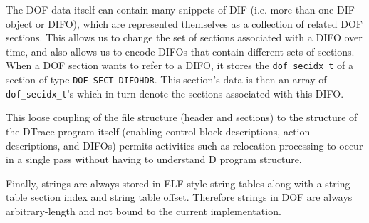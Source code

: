 The DOF data itself can contain many snippets of DIF (i.e. more than
one DIF object or DIFO), which are represented themselves as a
collection of related DOF sections.  This allows us to change the set
of sections associated with a DIFO over time, and also allows us to
encode DIFOs that contain different sets of sections.  When a DOF
section wants to refer to a DIFO, it stores the \verb|dof_secidx_t| of
a section of type \verb|DOF_SECT_DIFOHDR|.  This section's data is
then an array of \verb|dof_secidx_t|'s which in turn denote the
sections associated with this DIFO.

This loose coupling of the file structure (header and sections) to the
structure of the DTrace program itself (enabling control block
descriptions, action descriptions, and DIFOs) permits activities such
as relocation processing to occur in a single pass without having to
understand D program structure.

Finally, strings are always stored in ELF-style string tables along
with a string table section index and string table offset.  Therefore
strings in DOF are always arbitrary-length and not bound to the
current implementation.


